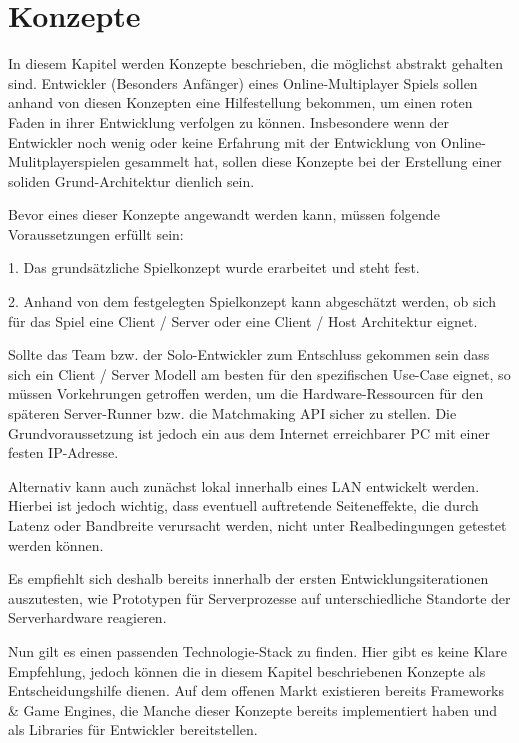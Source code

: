\chapter{Konzepte}
\label{sec:konzepte}

In diesem Kapitel werden Konzepte beschrieben, die möglichst abstrakt gehalten sind. Entwickler (Besonders Anfänger) eines Online-Multiplayer Spiels sollen anhand von diesen Konzepten eine Hilfestellung bekommen, um einen roten Faden in ihrer Entwicklung verfolgen zu können. Insbesondere wenn der Entwickler noch wenig oder keine Erfahrung mit der Entwicklung von Online-Mulitplayerspielen gesammelt hat, sollen diese Konzepte bei der Erstellung einer soliden Grund-Architektur dienlich sein.

Bevor eines dieser Konzepte angewandt werden kann, müssen folgende Voraussetzungen erfüllt sein:

1. Das grundsätzliche Spielkonzept wurde erarbeitet und steht fest.

2. Anhand von dem festgelegten Spielkonzept kann abgeschätzt werden, ob sich für das Spiel eine Client / Server oder eine Client / Host Architektur eignet.

Sollte das Team bzw. der Solo-Entwickler zum Entschluss gekommen sein dass sich ein Client / Server Modell am besten für den spezifischen Use-Case eignet, so müssen Vorkehrungen getroffen werden, um die Hardware-Ressourcen für den späteren Server-Runner bzw. die Matchmaking API sicher zu stellen. Die Grundvoraussetzung ist jedoch ein aus dem Internet erreichbarer PC mit einer festen IP-Adresse. 

Alternativ kann auch zunächst lokal innerhalb eines LAN \cite{Wikipedia.2022} entwickelt werden. Hierbei ist jedoch wichtig, dass eventuell auftretende Seiteneffekte, die durch Latenz \cite{Wikipedia.2022b} oder Bandbreite \cite{Wikipedia.2019b} verursacht werden, nicht unter Realbedingungen getestet werden können. 

Es empfiehlt sich deshalb bereits innerhalb der ersten Entwicklungsiterationen auszutesten, wie Prototypen für Serverprozesse auf unterschiedliche Standorte der Serverhardware reagieren. 

Nun gilt es einen passenden Technologie-Stack zu finden. Hier gibt es keine Klare Empfehlung, jedoch können die in diesem Kapitel beschriebenen Konzepte als Entscheidungshilfe dienen. Auf dem offenen Markt existieren bereits Frameworks \& Game Engines, die Manche dieser Konzepte bereits implementiert haben und als Libraries für Entwickler bereitstellen.

